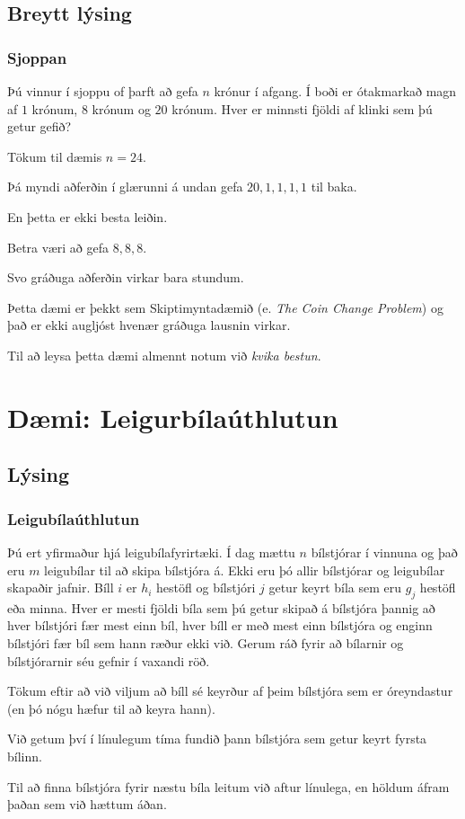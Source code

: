 \subsection{Breytt lýsing}
{
    \frametitle{Sjoppan}
    {
        \item<1-> 
            Þú vinnur í sjoppu of þarft að gefa $n$ krónur í afgang. 
            Í boði er ótakmarkað magn af $1$ krónum, $8$ krónum og $20$ krónum.
            Hver er minnsti fjöldi af klinki sem þú getur gefið?
        \item<2-> Tökum til dæmis $n = 24$.
        \item<3-> Þá myndi aðferðin í glærunni á undan gefa $20, 1, 1, 1, 1$ til baka.
        \item<4-> En þetta er ekki besta leiðin.
        \item<5-> Betra væri að gefa $8, 8, 8$.
        \item<6-> Svo gráðuga aðferðin virkar bara stundum.
        \item<7-> Þetta dæmi er þekkt sem Skiptimyntadæmið (e. \emph{The Coin Change Problem}) og það er ekki augljóst hvenær gráðuga lausnin virkar.
        \item<8-> Til að leysa þetta dæmi almennt notum við \emph{kvika bestun}.
    }
}

\section{Dæmi: Leigurbílaúthlutun}
\subsection{Lýsing}
{
    \frametitle{Leigubílaúthlutun}
    {
        \item<1-> 
            Þú ert yfirmaður hjá leigubílafyrirtæki.
            Í dag mættu $n$ bílstjórar í vinnuna og það eru $m$ leigubílar til að skipa bílstjóra á.
            Ekki eru þó allir bílstjórar og leigubílar skapaðir jafnir.
            Bíll $i$ er $h_i$ hestöfl og bílstjóri $j$ getur keyrt bíla sem eru $g_j$ hestöfl eða minna.
            Hver er mesti fjöldi bíla sem þú getur skipað á bílstjóra
            þannig að hver bílstjóri fær mest einn bíl,
            hver bíll er með mest einn bílstjóra og
            enginn bílstjóri fær bíl sem hann ræður ekki við.
            Gerum ráð fyrir að bílarnir og bílstjórarnir séu gefnir í vaxandi röð.
        \item<2-> Tökum eftir að við viljum að bíll sé keyrður af þeim bílstjóra sem er óreyndastur (en þó nógu hæfur til að keyra hann).
        \item<3-> Við getum því í línulegum tíma fundið þann bílstjóra sem getur keyrt fyrsta bílinn.
        \item<4-> Til að finna bílstjóra fyrir næstu bíla leitum við aftur línulega, en höldum áfram þaðan sem við hættum áðan.
    }
}

